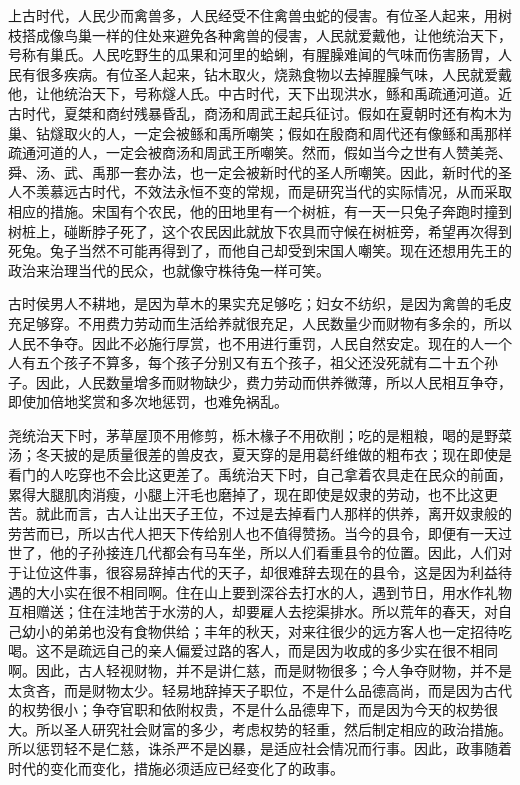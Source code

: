 \documentclass[12pt,UTF-8,openany]{ctexbook}
\begin{document}
\begin{normalsize}
    
    上古时代，人民少而禽兽多，人民经受不住禽兽虫蛇的侵害。有位圣人起来，用树枝搭成像鸟巢一样的住处来避免各种禽兽的侵害，人民就爱戴他，让他统治天下，号称有巢氏。人民吃野生的瓜果和河里的蛤蜊，有腥臊难闻的气味而伤害肠胃，人民有很多疾病。有位圣人起来，钻木取火，烧熟食物以去掉腥臊气味，人民就爱戴他，让他统治天下，号称燧人氏。中古时代，天下出现洪水，鲧和禹疏通河道。近古时代，夏桀和商纣残暴昏乱，商汤和周武王起兵征讨。假如在夏朝时还有构木为巢、钻燧取火的人，一定会被鲧和禹所嘲笑；假如在殷商和周代还有像鲧和禹那样疏通河道的人，一定会被商汤和周武王所嘲笑。然而，假如当今之世有人赞美尧、舜、汤、武、禹那一套办法，也一定会被新时代的圣人所嘲笑。因此，新时代的圣人不羡慕远古时代，不效法永恒不变的常规，而是研究当代的实际情况，从而采取相应的措施。宋国有个农民，他的田地里有一个树桩，有一天一只兔子奔跑时撞到树桩上，碰断脖子死了，这个农民因此就放下农具而守候在树桩旁，希望再次得到死兔。兔子当然不可能再得到了，而他自己却受到宋国人嘲笑。现在还想用先王的政治来治理当代的民众，也就像守株待兔一样可笑。
    
    古时侯男人不耕地，是因为草木的果实充足够吃；妇女不纺织，是因为禽兽的毛皮充足够穿。不用费力劳动而生活给养就很充足，人民数量少而财物有多余的，所以人民不争夺。因此不必施行厚赏，也不用进行重罚，人民自然安定。现在的人一个人有五个孩子不算多，每个孩子分别又有五个孩子，祖父还没死就有二十五个孙子。因此，人民数量增多而财物缺少，费力劳动而供养微薄，所以人民相互争夺，即使加倍地奖赏和多次地惩罚，也难免祸乱。
    
    尧统治天下时，茅草屋顶不用修剪，栎木椽子不用砍削；吃的是粗粮，喝的是野菜汤；冬天披的是质量很差的兽皮衣，夏天穿的是用葛纤维做的粗布衣；现在即使是看门的人吃穿也不会比这更差了。禹统治天下时，自己拿着农具走在民众的前面，累得大腿肌肉消瘦，小腿上汗毛也磨掉了，现在即使是奴隶的劳动，也不比这更苦。就此而言，古人让出天子王位，不过是去掉看门人那样的供养，离开奴隶般的劳苦而已，所以古代人把天下传给别人也不值得赞扬。当今的县令，即便有一天过世了，他的子孙接连几代都会有马车坐，所以人们看重县令的位置。因此，人们对于让位这件事，很容易辞掉古代的天子，却很难辞去现在的县令，这是因为利益待遇的大小实在很不相同啊。住在山上要到深谷去打水的人，遇到节日，用水作礼物互相赠送；住在洼地苦于水涝的人，却要雇人去挖渠排水。所以荒年的春天，对自己幼小的弟弟也没有食物供给；丰年的秋天，对来往很少的远方客人也一定招待吃喝。这不是疏远自己的亲人偏爱过路的客人，而是因为收成的多少实在很不相同啊。因此，古人轻视财物，并不是讲仁慈，而是财物很多；今人争夺财物，并不是太贪吝，而是财物太少。轻易地辞掉天子职位，不是什么品德高尚，而是因为古代的权势很小；争夺官职和依附权贵，不是什么品德卑下，而是因为今天的权势很大。所以圣人研究社会财富的多少，考虑权势的轻重，然后制定相应的政治措施。所以惩罚轻不是仁慈，诛杀严不是凶暴，是适应社会情况而行事。因此，政事随着时代的变化而变化，措施必须适应已经变化了的政事。
    
\end{normalsize}
\end{document}
